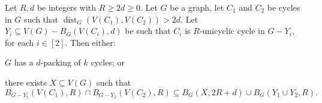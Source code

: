 \documentclass{patmorin}
\newcommand{\pat}[1]{\textcolor{Blue}{Pat: #1}}
\newcommand{\piotr}[1]{\textcolor{red}{Piotr: #1}}
\DeclareMathOperator{\dist}{dist}
\begin{document}

\begin{lem}\label{double_unicycle}
  Let $R,d$ be integers with $R\geq 2d\geq 0$.
  Let $G$ be a graph,
  let $C_1$ and $C_2$ be cycles in $G$ such that
  $\dist_G(V(C_1),V(C_2))>2d$.
  Let $Y_i\subseteq V(G) - B_G(V(C_i),d)$ be such that $C_i$ is $R$-unicyclic cycle in $G-Y_i$,
  for each $i\in[2]$.
  Then either:
  \begin{compactenum}[(a)]
    \item $G$ has a $d$-packing of $k$ cycles; or
    \item there exists $X\subseteq V(G)$ such that \[
    B_{G-Y_1}(V(C_1),R)\cap B_{G-Y_2}(V(C_2),R) \subseteq B_G(X,2R+d) \cup B_G(Y_1\cup Y_2,R).
    \]
  \end{compactenum}
\end{lem}
\end{document}
